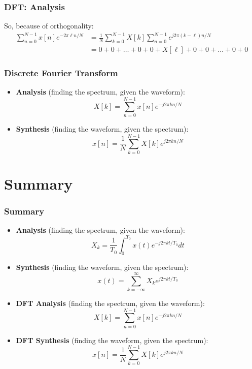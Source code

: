 \documentclass{beamer}
\begin{document}
\begin{frame}
  \frametitle{DFT: Analysis}

  So, because of orthogonality:
  \begin{align*}
  \sum_{n=0}^{N-1}x[n]e^{-2\pi\ell n/N} &=
  \frac{1}{N}\sum_{k=0}^{N-1} X[k]\sum_{n=0}^{N-1} e^{j2\pi (k-\ell)n/N}\\
  &= 0+ 0+ \ldots + 0 + 0 + X[\ell] + 0 +0 + \ldots + 0 + 0
  \end{align*}
  
\end{frame}  

\begin{frame}
  \frametitle{Discrete Fourier Transform}

  \begin{itemize}
  \item {\bf Analysis}  (finding the spectrum, given the waveform):
    \[
    X[k] = \sum_{n=0}^{N-1} x[n]e^{-j2\pi kn/N}
    \]
  \item {\bf Synthesis} (finding the waveform, given the spectrum):
    \[
    x[n] = \frac{1}{N}\sum_{k=0}^{N-1} X[k] e^{j2\pi kn/N}
    \]
  \end{itemize}
  
\end{frame}  


\section[Summary]{Summary}
\setcounter{subsection}{1}

\begin{frame}
  \frametitle{Summary}
  \begin{itemize}
  \item {\bf Analysis}  (finding the spectrum, given the waveform):
    \[
    X_k = \frac{1}{T_0}\int_0^{T_0} x(t)e^{-j2\pi kt/T_0}dt
    \]
  \item {\bf Synthesis}  (finding the waveform, given the spectrum):
    \[
    x(t) = \sum_{k=-\infty}^\infty X_k e^{j2\pi kt/T_0}
    \]
  \item {\bf DFT Analysis}  (finding the spectrum, given the waveform):
    \[
    X[k] = \sum_{n=0}^{N-1} x[n]e^{-j2\pi kn/N}
    \]
  \item {\bf DFT Synthesis} (finding the waveform, given the spectrum):
    \[
    x[n] = \frac{1}{N}\sum_{k=0}^{N-1} X[k] e^{j2\pi kn/N}
    \]
  \end{itemize}
\end{frame}  
    
\end{document}
